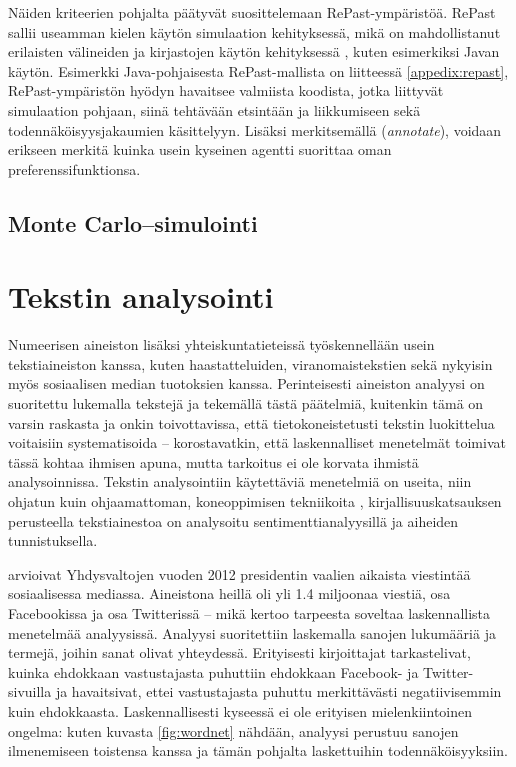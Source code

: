 \documentclass[finnish,gradu,twoside,12pt]{tktltiki}
\begin{document}
{Näiden kriteerien pohjalta \citet{Tobias2004} päätyvät suosittelemaan RePast-ympäristöä. RePast sallii useamman kielen käytön simulaation kehityksessä, mikä on mahdollistanut erilaisten välineiden ja kirjastojen käytön kehityksessä \cite{North2006}, kuten esimerkiksi Javan käytön. Esimerkki Java-pohjaisesta RePast-mallista on liitteessä \ref{appedix:repast}, RePast-ympäristön hyödyn havaitsee valmiista koodista, jotka liittyvät simulaation pohjaan, siinä tehtävään etsintään ja liikkumiseen sekä todennäköisyysjakaumien käsittelyyn. Lisäksi merkitsemällä (\textit{annotate}), voidaan erikseen merkitä kuinka usein kyseinen agentti suorittaa oman preferenssifunktionsa.

\subsection{Monte Carlo--simulointi}

\section{Tekstin analysointi}
\label{sec:textanalysis}

Numeerisen aineiston lisäksi yhteiskuntatieteissä työskennellään usein tekstiaineiston kanssa, kuten haastatteluiden, viranomaistekstien sekä nykyisin myös sosiaalisen median tuotoksien kanssa. Perinteisesti aineiston analyysi on suoritettu lukemalla tekstejä ja tekemällä tästä päätelmiä, kuitenkin tämä on varsin raskasta ja onkin toivottavissa, että tietokoneistetusti tekstin luokittelua voitaisiin systematisoida -- \citet{Grimmer2013} korostavatkin, että laskennalliset menetelmät toimivat tässä kohtaa ihmisen apuna, mutta tarkoitus ei ole korvata ihmistä analysoinnissa. Tekstin analysointiin käytettäviä menetelmiä on useita, niin ohjatun kuin ohjaamattoman, koneoppimisen tekniikoita \citep[esimerkiksi][]{Grimmer2013}, kirjallisuuskatsauksen perusteella tekstiainestoa on analysoitu sentimenttianalyysillä ja aiheiden tunnistuksella.

\citet{groshek2013public} arvioivat Yhdysvaltojen vuoden 2012 presidentin vaalien aikaista viestintää sosiaalisessa mediassa. Aineistona heillä oli yli 1.4 miljoonaa viestiä, osa Facebookissa ja osa Twitterissä -- mikä kertoo tarpeesta soveltaa laskennallista menetelmää analyysissä. Analyysi suoritettiin laskemalla sanojen lukumääriä ja termejä, joihin sanat olivat yhteydessä. Erityisesti kirjoittajat tarkastelivat, kuinka ehdokkaan vastustajasta puhuttiin ehdokkaan Facebook- ja Twitter-sivuilla ja havaitsivat, ettei vastustajasta puhuttu merkittävästi negatiivisemmin kuin ehdokkaasta. Laskennallisesti kyseessä ei ole erityisen mielenkiintoinen ongelma: kuten kuvasta \ref{fig:wordnet} nähdään, analyysi perustuu sanojen ilmenemiseen toistensa kanssa ja tämän pohjalta laskettuihin todennäköisyyksiin.

}
\end{document}
